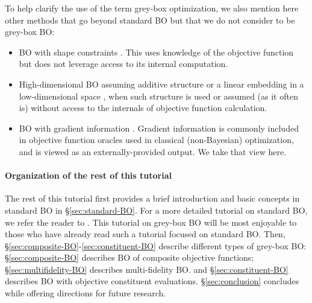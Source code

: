 \documentclass{wscpaperproc}
\newcommand{\savelength}[1]{} %
\theoremstyle{wsc}
\begin{document}
To help clarify the use of the term grey-box optimization, we also mention here other methods that go beyond standard BO but that we do not consider to be grey-box BO: 
\begin{itemize}
\item BO with shape constraints . This uses knowledge of the objective function but does not leverage access to its internal computation.
\item High-dimensional BO assuming additive structure 
or a linear embedding in a low-dimensional space , when such structure is used or assumed (as it often is) without access to the internals of objective function calculation.
\item BO with gradient information . Gradient information is commonly included in objective function oracles used in classical (non-Bayesian) optimization, and is viewed as an externally-provided output. We take that view here.
\end{itemize}


\paragraph{Organization of the rest of this tutorial} The rest of this tutorial first provides a brief introduction and basic concepts in standard BO in \S\ref{sec:standard-BO}.  For a more detailed tutorial on standard BO, we refer the reader to . This tutorial on grey-box BO will be most enjoyable to those who have already read such a tutorial focused on standard BO.
Then, \S\ref{sec:composite-BO}-\ref{sec:constituent-BO}
describe different types of grey-box BO:
\S\ref{sec:composite-BO} describes BO of composite objective functions;
\S\ref{sec:multifidelity-BO} describes multi-fidelity BO.
and \S\ref{sec:constituent-BO} describes BO with objective constituent evaluations.
\S\ref{sec:conclusion} concludes while offering directions for future research.

\savelength{
The goal of this tutorial is to elucidate and explain these three classes of problems, and to position researchers interested in this area to rapidly advance the state of the art.
Grey-box BO is an exciting area where a great deal remains to be discovered, with numerous opportunities to leverage the internal computational structure of objective / constraint evaluation to dramatically improve efficiency.
}
\end{document}
